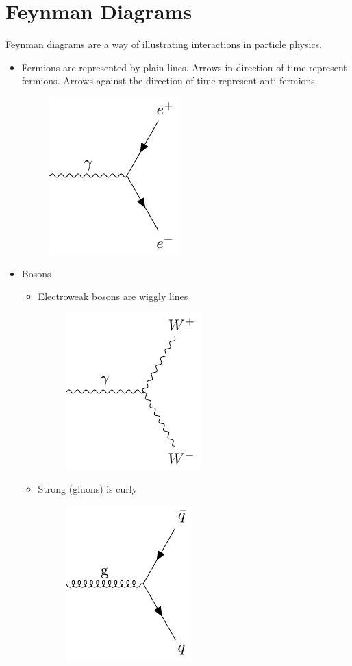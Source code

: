 \documentclass[a4paper, 11pt, normalem]{report}
\begin{document}
\section{Feynman Diagrams}
Feynman diagrams are a way of illustrating interactions in particle physics.
\begin{itemize}
    \item Fermions are represented by plain lines. Arrows in direction of time represent fermions. Arrows against the direction of time represent anti-fermions.
        \begin{figure}[H]
            \centering
            \includegraphics{gluon2.pdf}
        \end{figure}
    \item Bosons
        \begin{itemize}
            \item Electroweak bosons are wiggly lines
                \begin{figure}[H]
                    \centering
                    \includegraphics{w1.pdf}
                \end{figure}
            \item Strong (gluons) is curly
                \begin{figure}[H]
                    \centering
                    \includegraphics{gluon1.pdf}

\end{figure}
\end{itemize}
\end{itemize}
\end{document}
